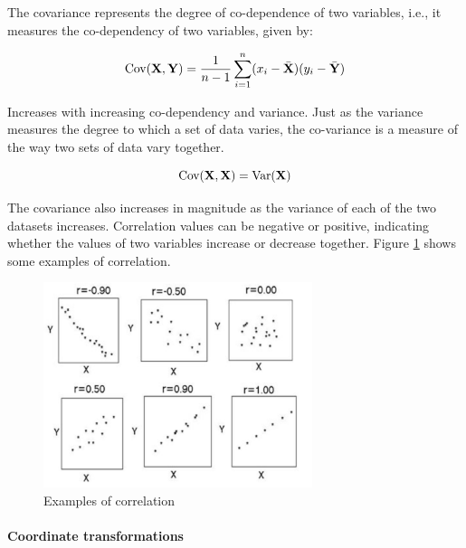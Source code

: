 \documentclass[11pt, oneside]{article}   	%
\begin{document}
The covariance represents the degree of co-dependence of two variables, i.e., it measures the co-dependency of two variables, given by:

\begin{equation}
   \text{Cov} ({\bf X}, {\bf Y}) = \frac{1}{n-1} \sum_{i=1}^{n} (x_i - \bar{ {\bf X}}) (y_i - \bar{ {\bf Y}})
\end{equation}

Increases with increasing co-dependency and variance. Just as the variance measures the degree to which a set of data varies, the co-variance is a measure of the way two sets of data vary together.

\begin{equation}
   \text{Cov} ({\bf X}, {\bf X}) = \text{Var}({\bf X})
\end{equation}

The covariance also increases in magnitude as the variance of each of the two datasets increases.
Correlation values can be negative or positive, indicating whether the values of two variables increase or decrease together. Figure \ref{fig:examples-correlation} shows some examples of correlation.

\begin{figure}[!h]
	\centering
	\includegraphics[width=0.7\textwidth]{examples-correlation}
	\caption{Examples of correlation}
	\label{fig:examples-correlation}
\end{figure}



\paragraph{Coordinate transformations}
\paragraph{}
\end{document}
